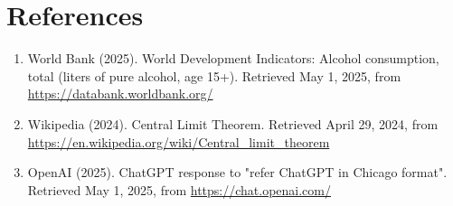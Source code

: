 \documentclass[12pt,a4paper]{article}
\begin{document}
	\section*{References}
	\begin{enumerate}
		\item World Bank (2025). World Development Indicators: Alcohol consumption, total (liters of pure alcohol, age 15+). Retrieved May 1, 2025, from \url{https://databank.worldbank.org/}
		\item Wikipedia (2024). Central Limit Theorem. Retrieved April 29, 2024, from \url{https://en.wikipedia.org/wiki/Central_limit_theorem}
		\item OpenAI (2025). ChatGPT response to "refer ChatGPT in Chicago format". Retrieved May 1, 2025, from \url{https://chat.openai.com/}
	\end{enumerate}
	
\end{document}
